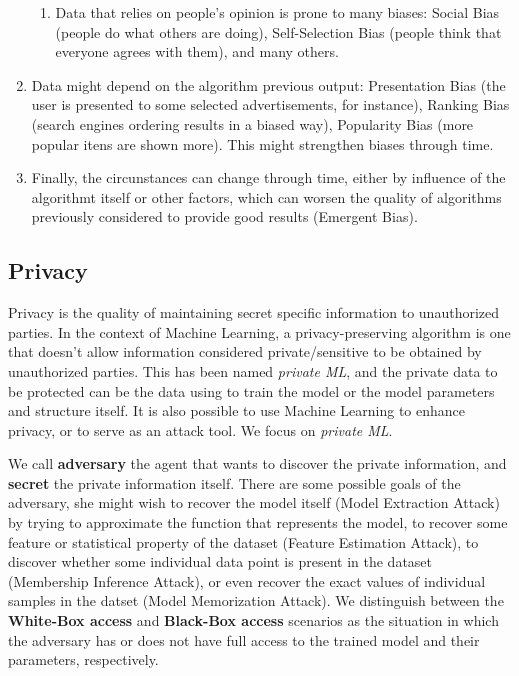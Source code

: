 \begin{enumerate}
\begin{enumerate}
    \item Data that relies on people's opinion is prone to many biases: Social Bias (people do what others are doing), Self-Selection Bias (people think that everyone agrees with them), and many others.
    \end{enumerate}
\item Data might depend on the algorithm previous output: Presentation Bias (the user is presented to some selected advertisements, for instance), Ranking Bias (search engines ordering results in a biased way), Popularity Bias (more popular itens are shown more). This might strengthen biases through time. 
\item Finally, the circunstances can change through time, either by influence of the algorithmt itself or other factors, which can worsen the quality of algorithms previously considered to provide good results (Emergent Bias).
\end{enumerate}


\subsection{Privacy}



Privacy is the quality of maintaining secret specific information to unauthorized parties. In the context of Machine Learning, a privacy-preserving algorithm is one that doesn't allow information considered private/sensitive to be obtained by unauthorized parties. This has been named \textit{private ML}\cite{WMLMPASAO}, and the private data to be protected can be the data using to train the model or the model parameters and structure itself. It is also possible to use Machine Learning to enhance privacy, or to serve as an attack tool. We focus on \textit{private ML}. 

We call \textbf{adversary} the agent that wants to discover the private information, and \textbf{secret} the private information itself. There are some possible goals of the adversary, she might wish to recover the model itself (Model Extraction Attack) by trying to approximate the function that represents the model, to recover some feature or statistical property of the dataset (Feature Estimation Attack), to discover whether some individual data point is present in the dataset (Membership Inference Attack), or even recover the exact values of individual samples in the datset (Model Memorization Attack). We distinguish between the \textbf{White-Box access} and \textbf{Black-Box access} scenarios as the situation in which the adversary has or does not have full access to the trained model and their parameters, respectively.

